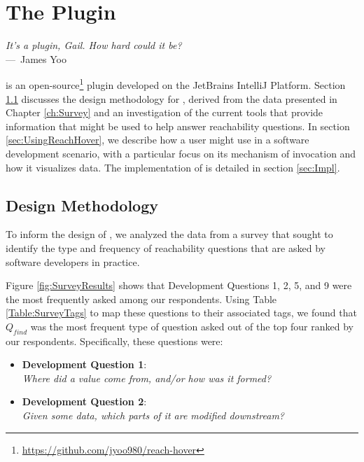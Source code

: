 
\chapter{The \toolname{} Plugin}
\label{ch:Tool}

\begin{epigraph}
  \emph{It's a plugin, Gail. How hard could it be?}\\
     ---~James Yoo
\end{epigraph}

\noindent \toolname{} is an open-source\footnote{\url{https://github.com/jyoo980/reach-hover}}
plugin developed on the JetBrains IntelliJ Platform.
Section \ref{sec:DesignMeth} discusses the design methodology for \toolname{},
derived from the data presented in Chapter \ref{ch:Survey} and an investigation
of the current tools that provide information that might be used to help answer
reachability questions.
In section \ref{sec:UsingReachHover}, we describe how a user might use
\toolname{} in a software development scenario, with a particular focus on
its mechanism of invocation and how it visualizes data.
The implementation of \toolname{} is detailed in section
\ref{sec:Impl}.

\section{Design Methodology}
\label{sec:DesignMeth}

\noindent To inform the design of \toolname{}, we analyzed the data from a 
survey that sought to identify the type and frequency of reachability questions 
that are asked by software developers in practice.

Figure \ref{fig:SurveyResults} shows that Development Questions 1, 2, 5, and 9
were the most frequently asked among our respondents.
Using Table \ref{Table:SurveyTags} to map these questions to their associated
tags, we found that $Q_{find}$ was the most frequent type of question asked out
of the top four ranked by our respondents.
Specifically, these questions were:

\begin{itemize}
  \item[] \textbf{Development Question 1}:\\ \textit{Where did a value come from,
  and/or how was it formed?}
  \item[] \textbf{Development Question 2}:\\ \textit{Given some data, which
  parts of it are modified downstream?}
\end{itemize}

